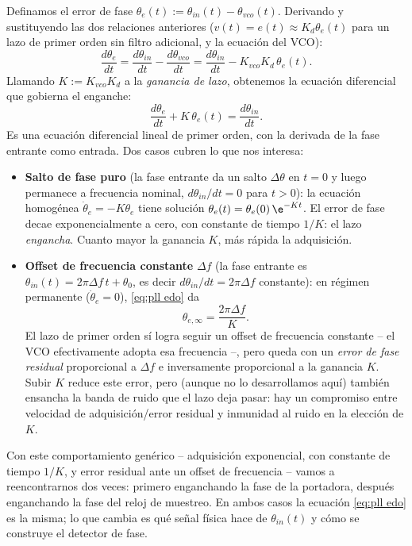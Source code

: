 Definamos el error de fase $\theta_e(t) := \theta_{in}(t) - \theta_{vco}(t)$. Derivando y sustituyendo las dos relaciones anteriores ($v(t)=e(t)\approx K_d\theta_e(t)$ para un lazo de primer orden sin filtro adicional, y la ecuación del VCO):
\begin{equation*}
    \frac{d\theta_e}{dt} = \frac{d\theta_{in}}{dt} - \frac{d\theta_{vco}}{dt} = \frac{d\theta_{in}}{dt} - K_{vco}K_d\,\theta_e(t).
\end{equation*}
Llamando $K:=K_{vco}K_d$ a la \emph{ganancia de lazo}, obtenemos la ecuación diferencial que gobierna el enganche:
\begin{equation}\label{eq:pll edo}
    \frac{d\theta_e}{dt} + K\,\theta_e(t) = \frac{d\theta_{in}}{dt}.
\end{equation}
Es una ecuación diferencial lineal de primer orden, con la derivada de la fase entrante como entrada. Dos casos cubren lo que nos interesa:

\begin{itemize}
    \item \textbf{Salto de fase puro} (la fase entrante da un salto $\Delta\theta$ en $t=0$ y luego permanece a frecuencia nominal, $d\theta_{in}/dt=0$ para $t>0$): la ecuación homogénea $\dot\theta_e = -K\theta_e$ tiene solución $\theta_e(t)=\theta_e(0)\,\e^{-Kt}$. El error de fase decae exponencialmente a cero, con constante de tiempo $1/K$: el lazo \emph{engancha}. Cuanto mayor la ganancia $K$, más rápida la adquisición.
    \item \textbf{Offset de frecuencia constante} $\Delta f$ (la fase entrante es $\theta_{in}(t)=2\pi\Delta f\, t+\theta_0$, es decir $d\theta_{in}/dt = 2\pi\Delta f$ constante): en régimen permanente ($\dot\theta_e=0$), \eqref{eq:pll edo} da
    \begin{equation}\label{eq:pll error regimen}
        \theta_{e,\infty} = \frac{2\pi\Delta f}{K}.
    \end{equation}
    El lazo de primer orden sí logra seguir un offset de frecuencia constante -- el VCO efectivamente adopta esa frecuencia --, pero queda con un \emph{error de fase residual} proporcional a $\Delta f$ e inversamente proporcional a la ganancia $K$. Subir $K$ reduce este error, pero (aunque no lo desarrollamos aquí) también ensancha la banda de ruido que el lazo deja pasar: hay un compromiso entre velocidad de adquisición/error residual y inmunidad al ruido en la elección de $K$.
\end{itemize}

Con este comportamiento genérico -- adquisición exponencial, con constante de tiempo $1/K$, y error residual ante un offset de frecuencia -- vamos a reencontrarnos dos veces: primero enganchando la fase de la portadora, después enganchando la fase del reloj de muestreo. En ambos casos la ecuación \eqref{eq:pll edo} es la misma; lo que cambia es qué señal física hace de $\theta_{in}(t)$ y cómo se construye el detector de fase.

